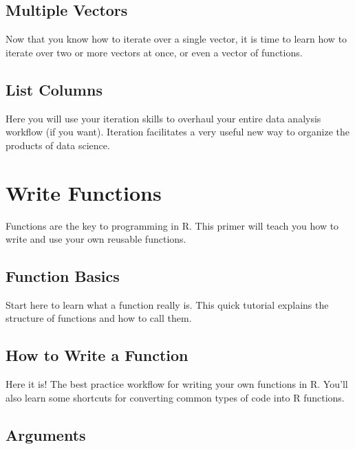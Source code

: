 \documentclass[
]{article}
\begin{document}
\hypertarget{multiple-vectors}{%
\subsection{Multiple Vectors}\label{multiple-vectors}}

Now that you know how to iterate over a single vector, it is time to
learn how to iterate over two or more vectors at once, or even a vector
of functions.

\hypertarget{list-columns}{%
\subsection{List Columns}\label{list-columns}}

Here you will use your iteration skills to overhaul your entire data
analysis workflow (if you want). Iteration facilitates a very useful new
way to organize the products of data science.

\hypertarget{write-functions}{%
\section{Write Functions}\label{write-functions}}

Functions are the key to programming in R. This primer will teach you
how to write and use your own reusable functions.

\hypertarget{function-basics}{%
\subsection{Function Basics}\label{function-basics}}

Start here to learn what a function really is. This quick tutorial
explains the structure of functions and how to call them.

\hypertarget{how-to-write-a-function}{%
\subsection{How to Write a Function}\label{how-to-write-a-function}}

Here it is! The best practice workflow for writing your own functions in
R. You'll also learn some shortcuts for converting common types of code
into R functions.

\hypertarget{arguments-2}{%
\subsection{Arguments}\label{arguments-2}}
\end{document}
